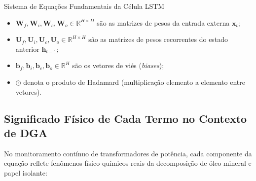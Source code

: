 \documentclass[11pt,a4paper]{article}
\begin{document}
\begin{mathBox}{Sistema de Equações Fundamentais da Célula LSTM}
\begin{itemize}
  \item $\mathbf{W}_f, \mathbf{W}_i, \mathbf{W}_c, \mathbf{W}_o \in \mathbb{R}^{H \times D}$ são as matrizes de pesos da entrada externa $\mathbf{x}_t$;
  \item $\mathbf{U}_f, \mathbf{U}_i, \mathbf{U}_c, \mathbf{U}_o \in \mathbb{R}^{H \times H}$ são as matrizes de pesos recorrentes do estado anterior $\mathbf{h}_{t-1}$;
  \item $\mathbf{b}_f, \mathbf{b}_i, \mathbf{b}_c, \mathbf{b}_o \in \mathbb{R}^H$ são os vetores de viés (\textit{biases});
  \item $\odot$ denota o produto de Hadamard (multiplicação elemento a elemento entre vetores).
\end{itemize}
\end{mathBox}

\subsection{Significado Físico de Cada Termo no Contexto de DGA}
No monitoramento contínuo de transformadores de potência, cada componente da equação reflete fenômenos físico-químicos reais da decomposição de óleo mineral e papel isolante:
\end{document}
